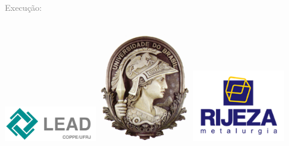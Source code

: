 





\thispagestyle{empty}


\hypersetup{pageanchor=false}

\vspace{4cm}

 \textcolor{gray}{Execução:} \\
\\
\begin{minipage}{\textwidth}
	\centering
	\includegraphics[width=0.3\textwidth]{logo/lead-logo}
    \hspace{0.5cm}
	\includegraphics[width=0.3\textwidth,
    height=0.2\textwidth,keepaspectratio]{logo/minerva07}
    \hspace{0.5cm}
    \includegraphics[width=0.3\textwidth]{logo/rijeza-logo}
	
\end{minipage}

